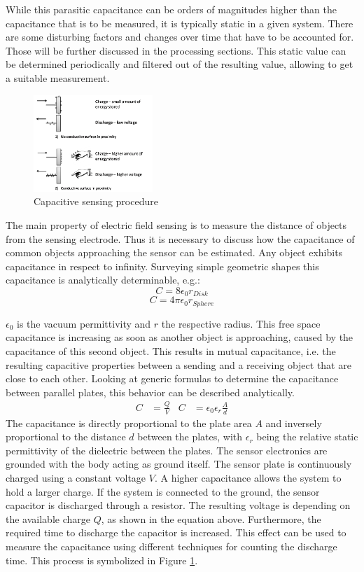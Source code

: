 While this parasitic capacitance can be orders of magnitudes higher than the capacitance that is to be measured, it is typically static in a given system. There are some disturbing factors and changes over time that have to be accounted for. Those will be further discussed in the processing sections. This static value can be determined periodically and filtered out of the resulting value, allowing to get a suitable measurement. 
\begin{figure}[h]
\centering
\includegraphics[width=0.4\textwidth]{images/cap_procedure.png}
\caption{Capacitive sensing procedure}
\label{fig:cap_procedure}
\end{figure} 
The main property of electric field sensing is to measure the distance of objects from the sensing electrode. Thus it is necessary to discuss how the capacitance of common objects approaching the sensor can be estimated. Any object exhibits capacitance in respect to infinity. Surveying simple geometric shapes this capacitance is analytically determinable, e.g.:
\begin{equation}
C=8\epsilon_{0}r_{Disk}
\end{equation}
\begin{equation}
C=4\pi\epsilon_{0}r_{Sphere}
\end{equation}

\(\epsilon_{0}\) is the vacuum permittivity and \(r\) the respective radius. This free space capacitance is increasing as soon as another object is approaching, caused by the capacitance of this second object. This results in mutual capacitance, i.e. the resulting capacitive properties between a sending and a receiving object that are close to each other. Looking at generic formulas to determine the capacitance between parallel plates, this behavior can be described analytically.
\begin{align}
C&=\frac{Q}{V} & C&=\epsilon_{0}\epsilon_{r}\frac{A}{d}
\end{align}
The capacitance is directly proportional to the plate area \(A\) and inversely proportional to the distance $d$ between the plates, with \(\epsilon_{r}\) being the relative static permittivity of the dielectric between the plates. The sensor electronics are grounded with the body acting as ground itself. The sensor plate is continuously charged using a constant voltage \(V\). A higher capacitance allows the system to hold a larger charge. If the system is connected to the ground, the sensor capacitor is discharged through a resistor. The resulting voltage is depending on the available charge $Q$, as shown in the equation above. Furthermore, the required time to discharge the capacitor is increased. This effect can be used to measure the capacitance using different techniques for counting the discharge time. This process is symbolized in Figure \ref{fig:cap_procedure}.

